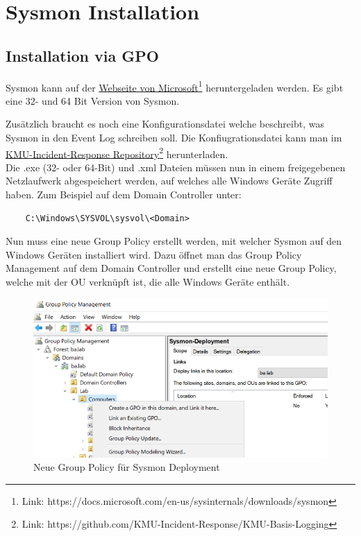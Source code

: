 \chapter{Sysmon Installation}

\section{Installation via GPO}

Sysmon kann auf der \href{https://docs.microsoft.com/en-us/sysinternals/downloads/sysmon}{Webseite von Microsoft}\footnote{Link: https://docs.microsoft.com/en-us/sysinternals/downloads/sysmon} heruntergeladen werden.
Es gibt eine 32- und 64 Bit Version von Sysmon.

Zusätzlich braucht es noch eine Konfigurationsdatei welche beschreibt, was Sysmon in den Event Log schreiben soll.
Die Konfiugrationsdatei kann man im \href{https://github.com/KMU-Incident-Response/KMU-Basis-Logging}{KMU-Incident-Response Repository}\footnote{Link: https://github.com/KMU-Incident-Response/KMU-Basis-Logging} herunterladen.\\

Die .exe (32- oder 64-Bit) und .xml Dateien müssen nun in einem freigegebenen Netzlaufwerk abgespeichert werden, auf welches alle Windows Geräte Zugriff haben. Zum Beispiel auf dem Domain Controller unter:
\begin{lstlisting}
    C:\Windows\SYSVOL\sysvol\<Domain>
\end{lstlisting}

Nun muss eine neue Group Policy erstellt werden, mit welcher Sysmon auf den Windows Geräten installiert wird.
Dazu öffnet man das Group Policy Management auf dem Domain Controller und erstellt eine neue Group Policy, welche mit der OU verknüpft ist, die alle Windows Geräte enthält.
\begin{figure}[H]
    \centering
    \includegraphics[width=0.7\linewidth]{../img/agent/create-new-group-policy.png}
    \caption{Neue Group Policy für Sysmon Deployment}
\end{figure}

